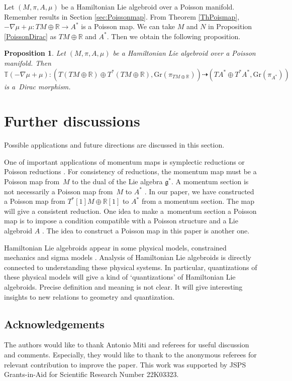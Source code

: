 \documentclass[pdftex]{sigma}
\numberwithin{equation}{section}
\newtheorem{Proposition}[Theorem]{Proposition}
 { \theoremstyle{definition}
\newtheorem{Definition}[Theorem]{Definition}
\newtheorem{Note}[Theorem]{Note}
\newtheorem{Example}[Theorem]{Example}
\newtheorem{Remark}[Theorem]{Remark}
\newtheorem{Question}[Theorem]{Question}
 }
\def\bR{{\mathbb{R}}}
\newcommand{\bbT}{{\mathbb{T}}}
\begin{document}
Let $(M, \pi, A, \mu)$ be a Hamiltonian Lie algebroid over a Poisson manifold.
Remember results in Section \ref{sec:Poissonmap}.
From Theorem \ref{ThPoismap},
$-\nabla \mu + \mu\colon TM \oplus \bR \rightarrow A^*$
is a Poisson map.
We can take $M$ and $N$ in Proposition \ref{PoissonDirac}
as $TM \oplus \bR$ and $A^*$. Then we obtain the following proposition.
\begin{Proposition}\label{Diracmorphism}
Let $(M, \pi, A, \mu)$ be a Hamiltonian Lie algebroid over a Poisson manifold.
Then
$\bbT (-\nabla \mu + \mu)\colon (T(TM \oplus \bR) \oplus T^*(TM \oplus \bR),
\mathrm{Gr}(\pi_{TM \oplus \bR}))
\dashrightarrow (TA^* \oplus T^*A^*, \mathrm{Gr}(\pi_{A^*}))$
is a~Dirac morphism.
\end{Proposition}

\section{Further discussions}
Possible applications and future directions are discussed in this section.

One of important applications of momentum maps is symplectic reductions \cite{MarsdenWeinstein, Meyer} or Poisson reductions \cite{MarsdenRatiu}.
For consistency of reductions, the momentum map must be a Poisson map from~$M$ to the dual of the Lie algebra $\mathfrak{g}^*$.
A momentum section is not necessarily a Poisson map from~$M$ to $A^*$
\cite{Blohmann:2023}.
In our paper, we have constructed a Poisson map from $T^*[1]M \oplus \bR[1]$
to $A^*$ from a momentum section. The map will give a consistent reduction.
One idea to make a~momentum section a Poisson map is to impose a condition compatible with a Poisson structure and a Lie algebroid $A$ \cite{Hirota:2023xqd}.
The idea to construct a Poisson map in this paper is another one.

Hamiltonian Lie algebroids appear in some physical models, constrained mechanics and sigma models \cite{Ikeda:2019pef}. Analysis of Hamiltonian Lie algebroids is directly connected to understanding these physical systems.
In particular, quantizations of these physical models will give a kind of `quantizations' of Hamiltonian Lie algebroids. Precise definition and meaning is not clear. It will give interesting insights to new relations to geometry and quantization.

\subsection*{Acknowledgements}
The authors would like to thank Antonio Miti and referees for useful discussion and comments.
Especially, they would like to thank to the anonymous referees for relevant contribution to improve the paper.
This work was supported by JSPS Grants-in-Aid for Scientific Research Number 22K03323.
\end{document}

